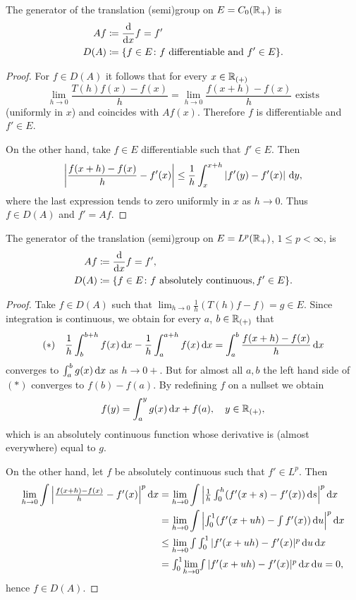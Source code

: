 The generator of the translation (semi)group on $E = C_{0}(\mathbb{R}_{+})$ is 
\begin{align*}
    Af & \coloneqq \frac{\mathop{}\!\mathrm{d}{}}{\mathop{}\!\mathrm{d}{x}}f = f' \\
    D(A) &\coloneqq \{f \in E \colon f \text{ differentiable and } f' \in E\}.
\end{align*}
\begin{proof}
For $f \in D(A)$ it follows that for every $x \in \mathbb{R}_{(+)}$
\[
    \lim_{h \to 0} \frac{T(h)f(x) - f(x)}{h} = \lim_{h \to 0} \frac{f(x+h) - f(x)}{h} \text{ exists}
\]
(uniformly in $x$) and coincides with $Af(x)$.
Therefore $f$ is differentiable and $f' \in E$.

On the other hand, take $f \in E$ differentiable such that $f' \in E$.
Then
\[
    \left|\frac{f(x+h) - f(x)}{h} - f'(x)\right| \leq \frac{1}{h}\int_{x}^{x+h}|f'(y) - f'(x)|\,\mathop{}\!\mathrm{d}{y},
\]
where the last expression tends to zero uniformly in $x$ as $h \to 0$.
Thus $f \in D(A)$ and $f' = Af$.
\end{proof}
The generator of the translation (semi)group on $E = L^{p}(\mathbb{R}_{+})$, $1 \leq p < \infty$, is
\begin{align*}
    Af &\coloneqq \frac{\mathop{}\!\mathrm{d}{}}{\mathop{}\!\mathrm{d}{x}}f = f', \\
    D(A) &\coloneqq \{f \in E \colon f \text{ absolutely continuous}, f' \in E\}.
\end{align*}
\begin{proof}
Take $f \in D(A)$ such that $\lim_{h \to 0} \frac{1}{h}(T(h)f - f) = g \in E$.
Since integration is continuous, we obtain for every $a$, $b \in \mathbb{R}_{(+)}$ that
\begin{equation*}\label{eq:a1-2.1}
(*) \quad \frac{1}{h}\int_{b}^{b+h} f(x) \mathop{}\!\mathrm{d}{x} - \frac{1}{h}\int_{a}^{a+h} f(x) \mathop{}\!\mathrm{d}{x} = \int_{a}^{b} \frac{f(x+h) - f(x)}{h} \mathop{}\!\mathrm{d}{x}
\end{equation*}
converges to $\int_{a}^{b} g(x) \mathop{}\!\mathrm{d}{x}$ as $h \to 0+$.
But for almost all $a, b$ the left hand side of $(*)$ converges to $f(b) - f(a)$.
By redefining $f$ on a nullset we obtain
\[
    f(y) = \int_{a}^{y} g(x)\mathop{}\!\mathrm{d}{x} + f(a), \quad y \in \mathbb{R}_{(+)},
\]
which is an absolutely continuous function whose derivative is (almost everywhere) equal to $g$.

On the other hand, let $f$ be absolutely continuous such that $f' \in L^{p}$.
Then
\begin{align*}
    \lim_{h \to 0} \int\textstyle{\left|\frac{f(x+h) - f(x)}{h} - f'(x)\right|^{p} \dx} 
    &= \lim_{h \to 0} \int \textstyle{\left|\frac{1}{h}\int_{0}^{h} (f'(x+s) - f'(x)) \ds\right|^{p} \dx }\\
    &= \lim_{h \to 0} \int \textstyle{\left|\int_{0}^{1} (f'(x+uh) -  \int f'(x)) \du\right|^{p} \dx }\\
    &\leq \lim_{h \to 0}\textstyle{ \int \int_{0}^{1} |f'(x+uh) - f'(x)|^p \du \dx }\\
    & = \textstyle{\int_{0}^{1}} \displaystyle{\lim_{h \to 0}} \textstyle{\int|f'(x+uh) - f'(x)|^{p} \dx \du = 0},
\end{align*}
hence $f \in D(A)$.
\end{proof}
